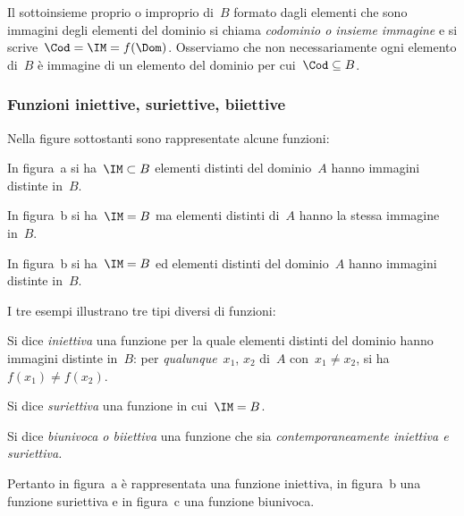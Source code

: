 Il sottoinsieme proprio o improprio di~\(B\) formato dagli elementi che sono
immagini degli elementi del dominio si chiama
\emph{codominio o insieme immagine} e si scrive~\(\Cod = \IM = f(\Dom)\). 
Osserviamo che non necessariamente
ogni elemento di~\(B\) è immagine di un elemento del dominio per 
cui~\(\Cod\subseteq B\).


\subsubsection{Funzioni iniettive, suriettive, biiettive}

\begin{exrig}
 \begin{esempio}
Nella figure sottostanti sono rappresentate alcune funzioni:
\begin{center}
 
\end{center}

In figura~a si ha~\(\IM\subset B\) elementi distinti del dominio~\(A\) hanno 
immagini distinte in~\(B\).

In figura~b si ha~\(\IM=B\) ma elementi distinti di~\(A\) hanno la stessa immagine 
in~\(B\).

In figura~b si ha~\(\IM=B\) ed elementi distinti del dominio~\(A\) hanno immagini 
distinte in~\(B\).
 \end{esempio}
\end{exrig}

I tre esempi illustrano tre tipi diversi di funzioni:

\begin{definizione}
Si dice \emph{iniettiva} una funzione per la quale elementi distinti del
dominio hanno immagini distinte in~\(B\): per \emph{qualunque}~\(x_1\), \(x_2\) di~\(A\)
con~\(x_1\neq x_2\), si ha~\(f(x_1)\neq f(x_2)\).
\end{definizione}

\begin{definizione}
Si dice \emph{suriettiva} una funzione in cui~\(\IM = B\).
\end{definizione}

\begin{definizione}
Si dice \emph{biunivoca o biiettiva} una funzione che sia
\emph{contemporaneamente iniettiva e suriettiva.}
\end{definizione}

Pertanto in figura~a è rappresentata una funzione iniettiva, in figura~b una
funzione suriettiva e in figura~c una funzione biunivoca.

